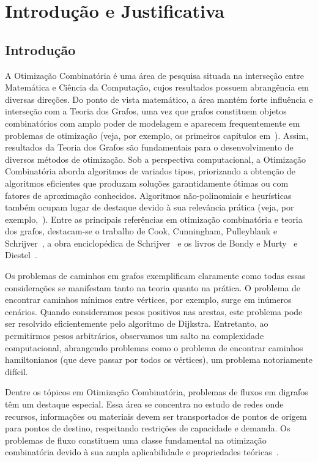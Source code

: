 \documentclass{amsart}
\begin{document}
\section{Introdução e Justificativa}

\subsection{Introdução}
A Otimização Combinatória é uma área de pesquisa situada na interseção entre Matemática e Ciência da Computação, cujos resultados possuem abrangência em diversas direções. Do ponto de vista matemático, a área mantém forte influência e interseção com a Teoria dos Grafos, uma vez que grafos constituem objetos combinatórios com amplo poder de modelagem e aparecem frequentemente em problemas de otimização (veja, por exemplo, os primeiros capítulos em~\cite{korte2018combinatorial}). Assim, resultados da Teoria dos Grafos são fundamentais para o desenvolvimento de diversos métodos de otimização. Sob a perspectiva computacional, a Otimização Combinatória aborda algoritmos de variados tipos, priorizando a obtenção de algoritmos eficientes que produzam soluções garantidamente ótimas ou com fatores de aproximação conhecidos. Algoritmos não-polinomiais e heurísticas também ocupam lugar de destaque devido à sua relevância prática (veja, por exemplo,~\cite{reeves1993modern}). Entre as principais referências em otimização combinatória e teoria dos grafos, destacam-se o trabalho de Cook, Cunningham, Pulleyblank e Schrijver~\cite{cook1998combinatorial}, a obra enciclopédica de Schrijver~\cite{schrijver2003combinatorial} e os livros de Bondy e Murty~\cite{bondy2008graph} e Diestel~\cite{diestel2017graph}.

Os problemas de caminhos em grafos exemplificam claramente como todas essas considerações se manifestam tanto na teoria quanto na prática. O problema de encontrar caminhos mínimos entre vértices, por exemplo, surge em inúmeros cenários. Quando consideramos pesos positivos nas arestas, este problema pode ser resolvido eficientemente pelo algoritmo de Dijkstra. Entretanto, ao permitirmos pesos arbitrários, observamos um salto na complexidade computacional, abrangendo problemas como o problema de encontrar caminhos hamiltonianos (que deve passar por todos os vértices), um problema notoriamente difícil.

Dentre os tópicos em Otimização Combinatória, problemas de fluxos em digrafos têm um destaque especial. Essa área se concentra no estudo de redes onde recursos, informações ou materiais devem ser transportados de pontos de origem para pontos de destino, respeitando restrições de capacidade e demanda. Os problemas de fluxo constituem uma classe fundamental na otimização combinatória devido à sua ampla aplicabilidade e propriedades teóricas~\cite{ahuja1993network}.
\end{document}
